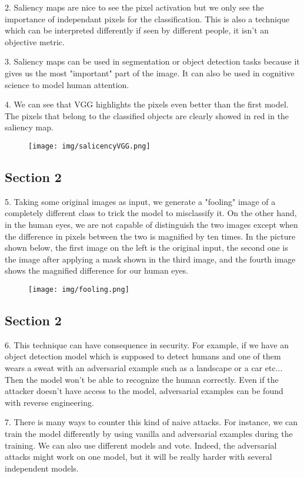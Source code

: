 2. Saliency maps are nice to see the pixel activation but we only see the importance of independant pixels for the classification. This is also a technique which can be interpreted differently if seen by different people, it isn't an objective metric. 

3. Saliency maps can be used in segmentation or object detection tasks because it gives us the most "important" part of the image. It can also be used in cognitive science to model human attention. 

4. We can see that VGG highlights the pixels even better than the first model. The pixels that belong to the classified objects are clearly showed in red in the saliency map.
\begin{figure}[H]
  \centering
    \texttt{[image: img/salicencyVGG.png]}
\end{figure}

\subsection{Section 2}

5. Taking some original images as input, we generate a "fooling" image of a completely different class to trick the model to misclassify it. On the other hand, in the human eyes, we are not capable of distinguish the two images except when the difference in pixels between the two is magnified by ten times. In the picture shown below, the first image on the left is the original input, the second one is the image after applying a mask shown in the third image, and the fourth image shows the magnified difference for our human eyes.
\begin{figure}[H]
  \centering
    \texttt{[image: img/fooling.png]}
\end{figure}

\subsection{Section 2}

6. This technique can have consequence in security. For example, if we have an object detection model which is supposed to detect humans and one of them wears a sweat with an adversarial example such as a landscape or a car etc... Then the model won't be able to recognize the human correctly. Even if the attacker doesn't have access to the model, adversarial examples can be found with reverse engineering.

7. There is many ways to counter this kind of naive attacks. For instance, we can train the model differently by using vanilla and adversarial examples during the training. We can also use different models and vote. Indeed, the adversarial attacks might work on one model, but it will be really harder with several independent models.

